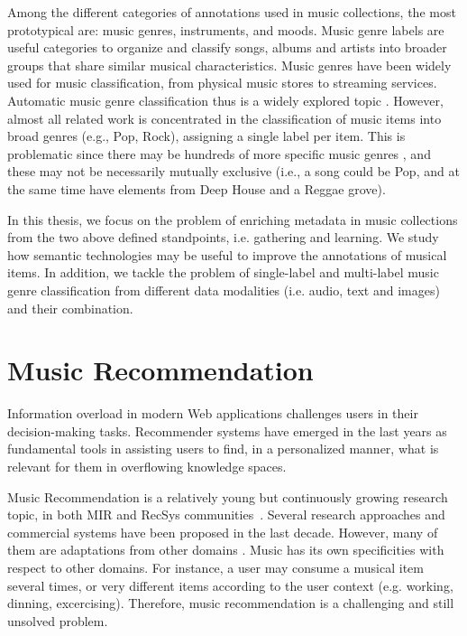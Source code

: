 Among the different categories of annotations used in music collections, the most prototypical are: music genres, instruments, and moods. 
Music genre labels are useful categories to organize and classify songs, albums and artists into broader groups that share similar musical characteristics. Music genres have been widely used for music classification, from physical music stores to streaming services. Automatic music genre classification thus is a widely explored topic \citep{sturm2012survey}.
However, almost all related work is concentrated in the classification of music items into broad genres (e.g., Pop, Rock), assigning a single label per item. This is problematic since there may be hundreds of more specific music genres \cite{pachet2000taxonomy}, and these may not be necessarily mutually exclusive (i.e., a song could be Pop, and at the same time have elements from Deep House and a Reggae grove). 

In this thesis, we focus on the problem of enriching metadata in music collections from the two above defined standpoints, i.e. gathering and learning. We study how semantic technologies may be useful to improve the annotations of musical items. In addition, we tackle the problem of single-label and multi-label music genre classification from different data modalities (i.e. audio, text and images) and their combination.


\section{Music Recommendation}
\label{sec:intro:recommendation}

Information overload in modern Web applications challenges users in their decision-making tasks. Recommender systems have emerged in the last years as fundamental tools in assisting users to find, in a personalized manner, what is relevant for them in overflowing knowledge spaces. 

Music Recommendation is a relatively young but continuously growing research topic, in both MIR and RecSys communities~\cite{oscarBook}. Several research approaches and commercial systems have been proposed in the last decade. However, many of them are adaptations from other domains \cite{oscarBook}. 
Music has its own specificities with respect to other domains. For instance, a user may consume a musical item several times, or very different items according to the user context (e.g. working, dinning, excercising). Therefore, music recommendation is a challenging and still unsolved problem.

